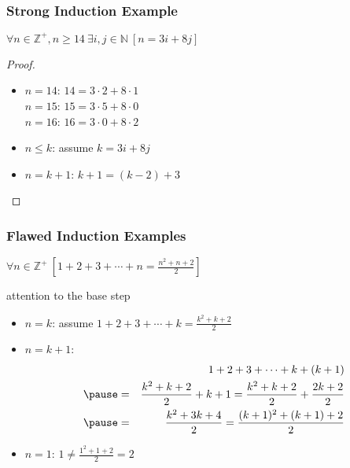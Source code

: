 \documentclass[dvipsnames]{beamer}
\begin{document}
\begin{frame}
  \frametitle{Strong Induction Example}

  \begin{theorem}
    $\forall n \in \mathbb{Z}^+, n \geq 14~\exists i,j \in \mathbb{N}~[n=3i+8j]$
  \end{theorem}

  \pause
  \begin{proof}
    \begin{itemize}
      \item $n=14$: $14=3 \cdot 2 + 8 \cdot 1$\\
        $n=15$: $15=3 \cdot 5 + 8 \cdot 0$\\
        $n=16$: $16=3 \cdot 0 + 8 \cdot 2$

      \pause
      \item $n \leq k$: assume $k=3i+8j$

      \pause
      \item $n=k+1$: $k+1=(k-2)+3$
    \end{itemize}
  \end{proof}
\end{frame}

\begin{frame}
  \frametitle{Flawed Induction Examples}

  \begin{theorem}
    $\forall n \in \mathbb{Z}^+~[1+2+3+\cdots+n=\frac{n^2+n+2}{2}]$
  \end{theorem}

  \pause
  \begin{block}{attention to the base step}
    \begin{itemize}
      \item $n=k$: assume $1+2+3+\cdots+k=\frac{k^2+k+2}{2}$

      \pause
      \item $n=k+1$:
      \begin{eqnarray*}
        &   & 1+2+3+\cdots+k+(k+1)\\\pause
        & = & \frac{k^2+k+2}{2}+k+1
          =   \frac{k^2+k+2}{2}+\frac{2k+2}{2}\\\pause
        & = & \frac{k^2+3k+4}{2}
          =   \frac{(k+1)^2+(k+1)+2}{2}
      \end{eqnarray*}

      \pause
      \item $n=1$: $1 \neq \frac{1^2+1+2}{2}=2$
    \end{itemize}
  \end{block}
\end{frame}
\end{document}
